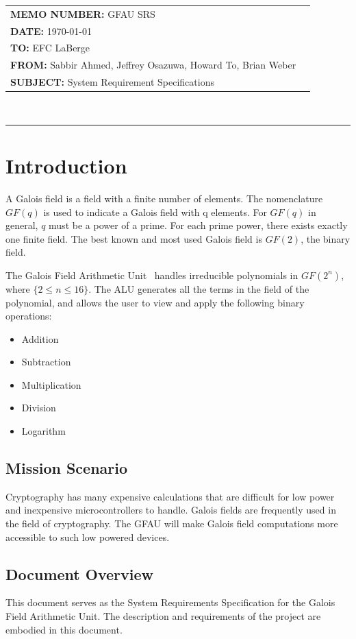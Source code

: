 \documentclass[paper=usletter, fontsize=14pt]{article}
\newcommand{\team}{Galois Field Arithmetic Unit}
\newcommand{\Sabbir}{Sabbir Ahmed}
\newcommand{\Jeffrey}{Jeffrey Osazuwa}
\newcommand{\Howard}{Howard To}
\newcommand{\Brian}{Brian Weber}
\newcommand{\documentinfo}[5]{
    \begin{centering}
        \parbox{2in}{
        \begin{spacing}{1}
            \begin{flushleft}
                \begin{tabular}{l l}
                    #1 \\
                    #2 \\
                    #3 \\
                    #4 \\
                    #5 \\
                \end{tabular}\\
                \rule{\textwidth}{1pt}
            \end{flushleft}
        \end{spacing}
        }
    \end{centering}
}
\begin{document}
    \documentinfo
    {\textbf{MEMO NUMBER:} GFAU SRS}
    {\textbf{DATE:} \today}
    {\textbf{TO: } EFC LaBerge}
    {\textbf{FROM: }\Sabbir, \Jeffrey, \Howard, \Brian}
    {\textbf{SUBJECT: } System Requirement Specifications}
    \vspace{-0.1in}

    \section{Introduction}
    A Galois field is a field with a finite number of elements. The nomenclature $GF(q)$ is used to indicate a Galois field with q elements. For $GF(q)$ in general, $q$ must be a power of a prime. For each prime power, there exists exactly one finite field. The best known and most used Galois field is $GF(2)$, the binary field.

    The \team~ handles irreducible polynomials in $GF(2^n)$, where $\{2 \leq n \leq 16\}$. The ALU generates all the terms in the field of the polynomial, and allows the user to view and apply the following binary operations:

    \begin{itemize}

        \item Addition
        \item Subtraction
        \item Multiplication
        \item Division
        \item Logarithm

    \end{itemize}

        \subsection{Mission Scenario}
        Cryptography has many expensive calculations that are difficult for low power and inexpensive microcontrollers to handle. Galois fields are frequently used in the field of cryptography. The GFAU will make Galois field computations more accessible to such low powered devices.

        \subsection{Document Overview}
        This document serves as the System Requirements Specification for the Galois Field Arithmetic Unit. The description and requirements of the project are embodied in this document.
\end{document}
